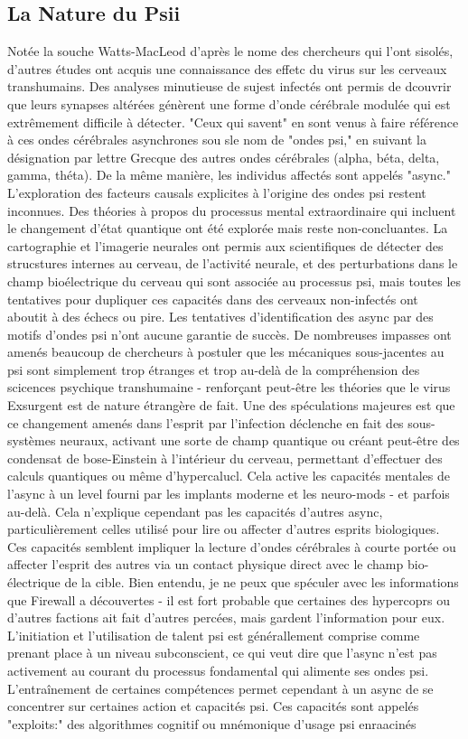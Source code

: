 \subsection{La Nature du Psii} Notée la souche Watts-MacLeod d'après le nome des chercheurs qui l'ont sisolés, d'autres études ont acquis une connaissance des effetc du virus sur les cerveaux transhumains. Des analyses minutieuse de sujest infectés ont permis de dcouvrir que leurs synapses altérées génèrent une forme d'onde cérébrale modulée qui est extrêmement difficile à détecter. "Ceux qui savent" en sont venus à faire référence à ces ondes cérébrales asynchrones sou sle nom de "ondes psi," en suivant la désignation par lettre Grecque  des autres ondes cérébrales (alpha, béta, delta, gamma, théta). De la même manière, les individus affectés sont appelés "async." L'exploration des facteurs causals explicites à l'origine des ondes psi restent inconnues. Des théories à propos du processus mental extraordinaire qui incluent le changement d'état quantique ont été explorée mais reste non-concluantes. La cartographie et l'imagerie neurales ont permis aux scientifiques de détecter des strucstures internes au cerveau, de l'activité neurale, et des perturbations dans le champ bioélectrique du cerveau qui sont associée au processus psi, mais toutes les tentatives pour dupliquer ces capacités dans des cerveaux non-infectés ont aboutit à des échecs ou pire. Les tentatives d'identification des async par des motifs d'ondes psi n'ont aucune garantie de succès. De nombreuses impasses ont amenés beaucoup de chercheurs à postuler que les mécaniques sous-jacentes au psi sont simplement trop étranges et trop au-delà de la compréhension des scicences psychique transhumaine - renforçant peut-être les théories que le virus Exsurgent est de nature étrangère de fait. Une des spéculations majeures est que ce changement amenés dans l'esprit par l'infection déclenche en fait des sous-systèmes neuraux, activant une sorte de champ quantique ou créant peut-être des condensat de bose-Einstein à l'intérieur du cerveau, permettant d'effectuer des calculs quantiques ou même d'hypercalucl. Cela active les capacités mentales de l'async à un level fourni par les implants moderne et les neuro-mods - et parfois au-delà. Cela n'explique cependant pas les capacités d'autres async, particulièrement celles utilisé pour lire ou affecter d'autres esprits biologiques. Ces capacités semblent impliquer la lecture d'ondes cérébrales à courte portée ou affecter l'esprit des autres via un contact physique direct avec le champ bio-électrique de la cible. Bien entendu, je ne peux que spéculer avec les informations que Firewall a découvertes - il est fort probable que certaines des hypercoprs ou d'autres factions ait fait d'autres percées, mais gardent l'information pour eux. L'initiation et l'utilisation de talent psi est générallement comprise comme prenant place à un niveau subconscient, ce qui veut dire que l'async n'est pas activement au courant du processus fondamental qui alimente ses ondes psi. L'entraînement de certaines compétences permet cependant à un async de se concentrer sur certaines action et capacités psi. Ces capacités sont appelés "exploits:" des algorithmes cognitif ou mnémonique d'usage psi enraacinés 